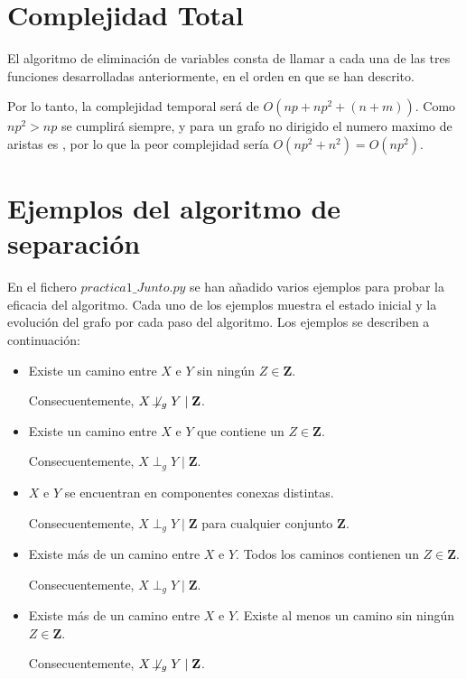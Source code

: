 \documentclass[a4paper,12pt]{article}
\newcommand{\notperpg}{\mathrel{\not\!\perp_g}}
\begin{document}
\section{Complejidad Total}
El algoritmo de eliminación de variables consta de llamar a cada una de las tres funciones desarrolladas anteriormente, en el orden en que se han descrito.

Por lo tanto, la complejidad temporal será de $O(np+np^2+(n+m))$. Como $np^2 > np$ se cumplirá siempre, y para un grafo no dirigido el numero maximo de aristas es , por lo que la peor complejidad sería $O(np^2 + n^2) = O(np^2)$.

\section{Ejemplos del algoritmo de separación}
En el fichero $practica1\_Junto.py$ se han añadido varios ejemplos para probar la eficacia del algoritmo. Cada uno de los ejemplos muestra el estado inicial y la evolución del grafo por cada paso del algoritmo. Los ejemplos se describen a continuación:

\begin{itemize}
    \item Existe un camino entre $X$ e $Y$ sin ningún $Z \in \textbf{Z}$. 
    
    Consecuentemente, $X \notperpg Y \mid \textbf{Z}$.
    
    \item Existe un camino entre $X$ e $Y$ que contiene un $Z \in \textbf{Z}$.

    Consecuentemente, $X \perp _g Y \mid \textbf{Z}$.
    
    \item $X$ e $Y$ se encuentran en componentes conexas distintas.

    Consecuentemente, $X \perp _g Y \mid \textbf{Z}$ para cualquier conjunto $\textbf{Z}$.

    \item Existe más de un camino entre $X$ e $Y$. Todos los caminos contienen un $Z \in \textbf{Z}$.

    Consecuentemente, $X \perp _g Y \mid \textbf{Z}$.

    \item Existe más de un camino entre $X$ e $Y$. Existe al menos
    un camino sin ningún $Z \in \textbf{Z}$.

    Consecuentemente, $X \notperpg Y \mid \textbf{Z}$.
    
\end{itemize}
\end{document}
